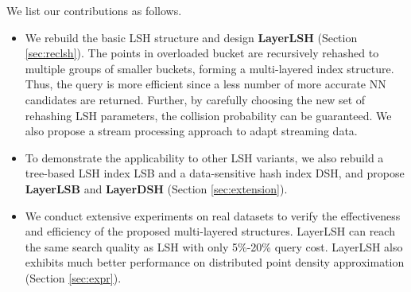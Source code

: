  We list our contributions as follows.
\begin{itemize}[leftmargin=*]
\item We rebuild the basic LSH structure and design \textbf{LayerLSH} (Section \ref{sec:reclsh}). The points in overloaded bucket are recursively rehashed to multiple groups of smaller buckets, forming a multi-layered index structure. Thus, the query is more efficient since a less number of more accurate NN candidates are returned. Further, by carefully choosing the new set of rehashing LSH parameters, the collision probability can be guaranteed. We also propose a stream processing approach to adapt streaming data.
\item To demonstrate the applicability to other LSH variants, we also rebuild a tree-based LSH index LSB and a data-sensitive hash index DSH, and propose \textbf{LayerLSB} and \textbf{LayerDSH} (Section \ref{sec:extension}).
\item We conduct extensive experiments on real datasets to verify the effectiveness and efficiency of the proposed multi-layered structures. LayerLSH can reach the same search quality as LSH with only 5\%-20\% query cost. LayerLSH also exhibits much better performance on distributed point density approximation (Section \ref{sec:expr}).
\end{itemize}

